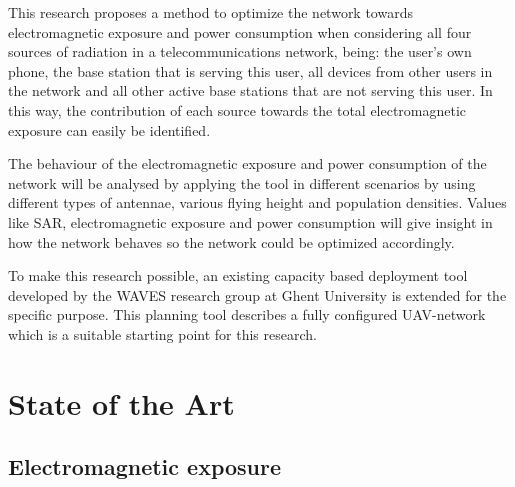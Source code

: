 \documentclass[twocolumn]{phdsymp} %
\begin{document}
This research proposes a method to optimize the network towards electromagnetic exposure and power consumption
when considering all four sources of radiation in a telecommunications network, being: the user's own phone,
 the base station that is serving this user, 
all devices from other users in the network and all 
other active base stations that are not serving this user. In this way, the contribution of each source towards the total 
electromagnetic exposure can easily be identified. 

The behaviour of the electromagnetic exposure and power consumption of the network will be analysed
 by applying the tool in different scenarios by using different types of antennae, various flying height and population 
densities.
Values like \gls{SAR}, electromagnetic exposure and power consumption will 
 give insight in how the network behaves so the network could be optimized accordingly.

To make this research possible, 
an existing capacity based deployment tool developed by the WAVES research group at Ghent University is extended for the specific purpose.
This planning tool describes a fully configured \gls{UAV}-network which is a suitable starting point for this research.

\section{State of the Art}
\subsection{Electromagnetic exposure}
\end{document}
